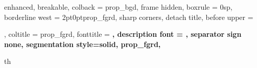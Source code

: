 \usepackage{amsmath, amssymb, amsthm, amsfonts, mathtools}
\usepackage{tikz, tikz-cd}
\usepackage{algorithmicx, algpseudocode, algorithm}
\usepackage{enumitem}
\usepackage{color, xcolor}
\usepackage{hyperref, graphicx}
\usepackage{mdframed, fancyhdr, parskip, titlesec}
\usepackage[margin=1in]{geometry}
\usepackage[english]{babel}
\usepackage[utf8]{inputenc}
\usepackage[sc]{mathpazo}
\usepackage{eulervm}

\newcommand{\header}[3]{\lhead{\textbf{#1}}\chead{\textbf{#2}}\rhead{\textbf{Due: #3}}\pagestyle{fancy}}

\usepackage[most,many,breakable]{tcolorbox}

{%
	enhanced,
	breakable,
	colback = prop_bgd,
	frame hidden,
	boxrule = 0sp,
	borderline west = {2pt}{0pt}{prop_fgrd},
	sharp corners,
	detach title,
	before upper = \tcbtitle\par\smallskip,
	coltitle = prop_fgrd,
	fonttitle = \bfseries\sffamily,
	description font = \mdseries,
	separator sign none,
	segmentation style={solid, prop_fgrd},
}
{th}

\newcommand{\prop}[2]{\begin{Prop}{#1}{}#2\end{Prop}}
\newcommand{\qs}[2]{\setcounter{section}{1}{\large\textbf{#1:}} #2}

\newcommand{\pf}[1]{\begin{proof}#1 \end{proof}}
\newenvironment{myproof}[1][\proofname]{%
	\proof[Proof of Claim.]%
}{\endproof}
\newcommand{\pfcl}[1]{\begin{myproof}#1 \end{myproof}}
\newenvironment{mysol}[1][\proofname]{%
	\proof[Solution. ]%
}{\endproof}
\newcommand{\sol}[1]{\begin{mysol}#1 \end{mysol}\newpage}
\newcommand{\solnn}[1]{\begin{mysol}#1 \end{mysol}}

